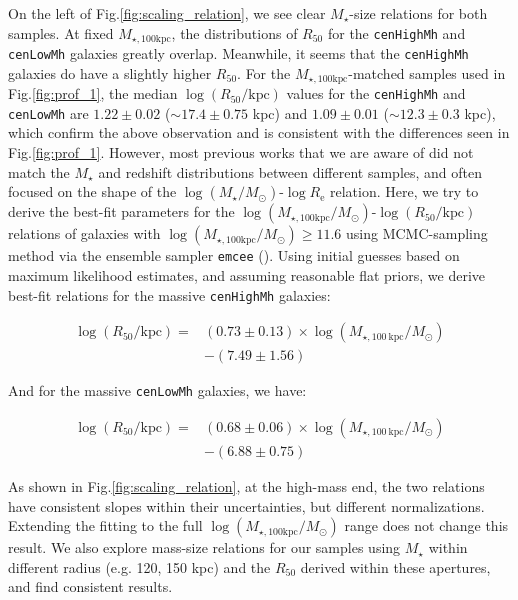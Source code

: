 \documentclass{emulateapj}
\def\rbcg{\texttt{cenHighMh}}
\def\nbcg{\texttt{cenLowMh}}
\def\mstar{{$M_{\star}$}}
\def\logms{{$\log (M_{\star}/M_{\odot})$}}
\def\mtot{{$M_{\star,100\mathrm{kpc}}$}}
\def\logmtot{{$\log (M_{\star,100\mathrm{kpc}}/M_{\odot})$}}
\begin{document}
\begin{CJK*}{UTF8}{gbsn}
    On the left of Fig.\ref{fig:scaling_relation}, we see clear \mstar{}-size relations 
    for both samples.  
    At fixed \mtot{}, the distributions of $R_{\mathrm{50}}$ for the \rbcg{} and
    \nbcg{} galaxies greatly overlap.  
    Meanwhile, it seems that the \rbcg{} galaxies do have a slightly higher 
    $R_{\mathrm{50}}$. 
    For the \mtot{}-matched samples used in Fig.\ref{fig:prof_1}, the median 
    $\log (R_{\mathrm{50}}/\mathrm{kpc})$ values for the \rbcg{} and \nbcg{} are 
    $1.22\pm 0.02$ ($\sim 17.4\pm 0.75$ kpc) and $1.09\pm 0.01$ 
    ($\sim 12.3\pm0.3$ kpc), which confirm the above observation and is consistent with 
    the differences seen in Fig.\ref{fig:prof_1}. 
    However, most previous works that we are aware of did not match the \mstar{} 
    and redshift distributions between different samples, and often focused on the shape 
    of the \logms{}-$\log R_{\mathrm{e}}$ relation.  
    Here, we try to derive the best-fit parameters for the 
    \logmtot{}-$\log (R_{\mathrm{50}}/\mathrm{kpc})$ relations of galaxies with 
    \logmtot{}$\geq 11.6$ using MCMC-sampling method via the ensemble sampler 
    \texttt{emcee} (\citealt{Emcee}). 
    Using initial guesses based on maximum likelihood estimates, and assuming reasonable 
    flat priors, we derive best-fit relations for the massive \rbcg{} galaxies:
    
    \begin{equation}
        \begin{aligned}
        \log (R_{\mathrm{50}}/\mathrm{kpc}) = & (0.73\pm0.13) \times \log (M_{\star, 100\ \mathrm{kpc}}/M_{\odot}) \\ & -(7.49\pm1.56)
        \end{aligned}
    \end{equation}

    \noindent And for the massive \nbcg{} galaxies, we have:
    
    \begin{equation}
        \begin{aligned}
        \log (R_{\mathrm{50}}/\mathrm{kpc}) = & (0.68\pm0.06) \times \log (M_{\star, 100\ \mathrm{kpc}}/M_{\odot}) \\ & -(6.88\pm0.75)
        \end{aligned}
    \end{equation}
    
    \noindent As shown in Fig.\ref{fig:scaling_relation}, at the high-mass end, the two relations 
    have consistent slopes within their uncertainties, but different normalizations. 
    Extending the fitting to the full \logmtot{} range does not change this result. 
    We also explore mass-size relations for our samples using \mstar{} within different 
    radius (e.g. 120, 150 kpc) and the $R_{\mathrm{50}}$ derived within these apertures, 
    and find consistent results.
    

\end{CJK*}
\end{document}
